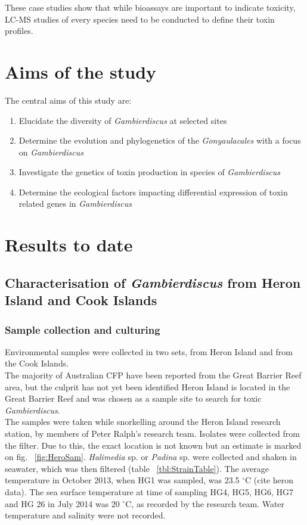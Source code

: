 \documentclass[12pt]{article}
\begin{document}
These case studies show that while bioassays are important to indicate toxicity, LC-MS studies of every species need to be conducted to define their toxin profiles.



\section{Aims of the study}
The central aims of this study are:
\begin{enumerate}
\item Elucidate the diversity of \emph{Gambierdiscus} at selected sites
\item Determine the evolution and phylogenetics of the \emph{Gonyaulacales} with a focus on \emph{Gambierdiscus}
\item Investigate the genetics of toxin production in species of \emph{Gambierdiscus}
\item Determine the ecological factors impacting differential expression of toxin related genes in \emph{Gambierdiscus}
\end{enumerate}

\section{Results to date}

\subsection{Characterisation of \emph{Gambierdiscus} from Heron Island and Cook Islands}

\subsubsection{Sample collection and culturing}
Environmental samples were collected in two sets, from Heron Island and from the Cook Islands.\\

The majority of Australian CFP have been reported from the Great Barrier Reef area, but the culprit has not yet been identified \cite{lewis2006ciguatera} Heron Island is located in the Great Barrier Reef and was chosen as a sample site to search for toxic \emph{Gambierdiscus}.\\ 
The samples were taken while snorkelling around the Heron Island research station, by members of Peter Ralph's research team. Isolates were collected from the filter. Due to this, the exact location is not known but an estimate is marked on fig. ~\ref{fig:HeroSam}. \emph{Halimedia} sp. or \emph{Padina} sp. were collected and shaken in seawater, which was then filtered (table ~\ref{tbl:StrainTable}). The average temperature in October 2013, when HG1 was sampled, was 23.5 $^{\circ}$C (cite heron data). The sea surface temperature at time of sampling HG4, HG5, HG6, HG7 and HG 26 in July 2014 was 20 $^{\circ}$C, as recorded by the research team. Water temperature and salinity were not recorded.
\end{document}
